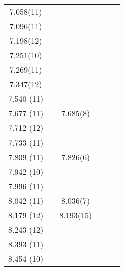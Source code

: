 \begin{center}
\begin{longtable}{cc cc cc}
7.058(11)         &          &                  &                     &             &                 \\
7.096(11)         &          &                  &                     &             &                 \\
7.198(12)         &          &                  &                     &             &                 \\
7.251(10)         &          &                  &                     &             &                 \\
7.269(11)         &          &                  &                     &             &                 \\
7.347(12)         &          &                  &                     &             &                 \\
  7.540 (11)      &          &                  &                     &             &                 \\
  7.677 (11)      &          &  7.685(8)        &                     &             &                 \\
  7.712 (12)      &          &                  &                     &             &                 \\
  7.733 (11)      &          &                  &                     &             &                 \\
  7.809 (11)      &          &  7.826(6)        &                     &             &                 \\
  7.942 (10)      &          &                  &                     &             &                 \\
  7.996 (11)      &          &                  &                     &             &                 \\
  8.042 (11)      &          &  8.036(7)        &                     &             &                 \\
  8.179 (12)      &          &  8.193(15)       &                     &             &                 \\
  8.243 (12)      &          &                  &                     &             &                 \\
  8.393 (11)      &          &                  &                     &             &                 \\
  8.454 (10)      &          &                  &                     &             &                 \\

\end{longtable}
\end{center}
